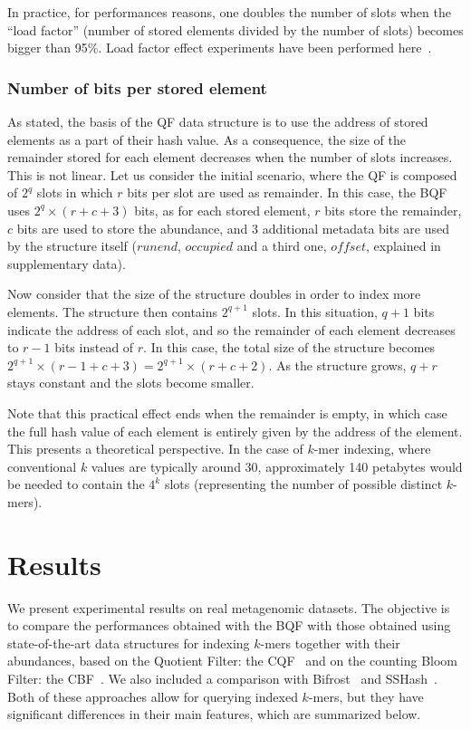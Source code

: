 In practice, for performances reasons, one doubles the number of slots when the ``load factor'' (number of stored elements divided by the number of slots) becomes bigger than 95\%. Load factor effect experiments have been performed here~\cite{counting_quotient_filter_2017}.


\subsubsection{Number of bits per stored element}\label{sssec:bit_per_element}
As stated, the basis of the QF data structure is to use the address of stored elements as a part of their hash value. As a consequence, the size of the remainder stored for each element decreases when the number of slots increases. This is not linear.  Let us consider the initial scenario, where the QF is composed of $2^q$ slots in which $r$ bits per slot are used as remainder. In this case, the BQF uses $2^q\times(r+c+3)$ bits, as for each stored element, $r$ bits store the remainder, $c$ bits are used to store the abundance, and 3 additional metadata bits are used by the structure itself ($runend$, $occupied$ and a third one, $offset$, explained in supplementary data).

Now consider that the size of the structure doubles in order to index more elements. The structure then contains $2^{q+1}$ slots. In this situation, $q+1$ bits indicate the address of each slot,  and so the remainder of each element decreases to $r-1$ bits instead of $r$. In this case, the total size of the structure becomes $2^{q+1}\times(r-1+c+3) = 2^{q+1}\times(r+c+2)$. As the structure grows, $q+r$ stays constant and the slots become smaller.

Note that this practical effect ends when the remainder is empty, in which case the full hash value of each element is entirely given by the address of the element. This presents a theoretical perspective. In the case of $k$-mer indexing, where conventional $k$ values are typically around 30, approximately 140 petabytes would be needed to contain the $4^k$ slots (representing the number of possible distinct $k$-mers).

\section{Results}
We present experimental results on real metagenomic datasets. The objective is to compare the performances obtained with the BQF with those obtained using state-of-the-art data structures for indexing $k$-mers together with their abundances, based on the Quotient Filter: the CQF~\cite{counting_quotient_filter_2017} and on the counting Bloom Filter: the CBF~\cite{fimpera_2023}. We also included a comparison with Bifrost~\cite{bifrost_2020} and SSHash~\cite{sshash_2023}. Both of these approaches allow for querying indexed $k$-mers, but they have significant differences in their main features, which are summarized below.

